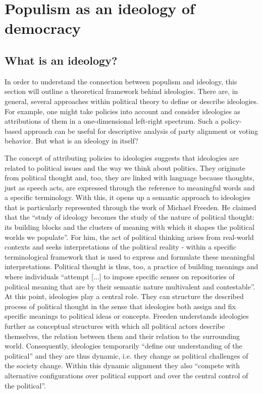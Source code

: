 \documentclass[a4paper]{scrreprt}
\begin{document}
\chapter{Populism as an ideology of democracy}
\section{What is an ideology?}
In order to understand the connection between populism and ideology, this section will outline a theoretical framework behind ideologies. There are, in general, several approaches within political theory to define or describe ideologies. For example, one might take policies into account and consider ideologies as attributions of them in a one-dimensional left-right spectrum. Such a policy-based approach can be useful for descriptive analysis of party alignment or voting behavior. \citep[p.~154]{lembcke:2014} But what is an ideology in itself?\par
The concept of attributing policies to ideologies suggests that ideologies are related to political issues and the way we think about politics. They originate from political thought and, too, they are linked with language because thoughts, just as speech acts, are expressed through the reference to meaningful words and a specific terminology. With this, it opens up a semantic approach to ideologies that is particularly represented through the work of Michael Freeden. He claimed that the ``study of ideology becomes the study of the nature of political thought: its building blocks and the clusters of meaning with which it shapes the political worlds we populate''. \cite[p.~15]{freeden:2006} For him, the act of political thinking arises from real-world contexts and seeks interpretations of the political reality - within a specific terminological framework that is used to express and formulate these meaningful interpretations. Political thought is thus, too, a practice of building meanings and where individuals ``attempt [...] to impose specific senses on repositories of political meaning that are by their semantic nature multivalent and contestable''. \cite[p.~19]{freeden:2006} At this point, ideologies play a central role. They can structure the described process of political thought in the sense that ideologies both assign and fix specific meanings to political ideas or concepts. Freeden understands ideologies further as conceptual structures with which all political actors describe themselves, the relation between them and their relation to the surrounding world. Consequently, ideologies temporarily ``define our understanding of the political'' and they are thus dynamic, i.e. they change as political challenges of the society change. Within this dynamic alignment they also ``compete with alternative configurations over political support and over the central control of the political''. \cite[p.~14]{freeden:2006}\par
\end{document}
